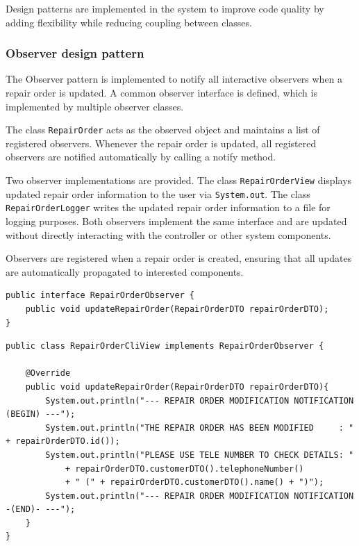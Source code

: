 \documentclass[a4paper]{scrartcl}
\begin{document}
Design patterns are implemented in the system to improve code quality by adding flexibility while reducing coupling between classes.

\subsubsection{Observer design pattern}

The Observer pattern is implemented to notify all interactive observers when a repair order is updated. A common observer interface is defined, which is implemented by multiple observer classes.

The class \texttt{RepairOrder} acts as the observed object and maintains a list of registered observers. Whenever the repair order is updated, all registered observers are notified automatically by calling a notify method.

Two observer implementations are provided. The class \texttt{RepairOrderView} displays updated repair order information to the user via \texttt{System.out}. The class \texttt{RepairOrderLogger} writes the updated repair order information to a file for logging purposes. Both observers implement the same interface and are updated without directly interacting with the controller or other system components.

Observers are registered when a repair order is created, ensuring that all updates are automatically propagated to interested components.

\begin{lstlisting}[style=javastyle, caption={RepairOrderObserver interface}]
public interface RepairOrderObserver {
    public void updateRepairOrder(RepairOrderDTO repairOrderDTO);
}
\end{lstlisting}

\begin{lstlisting}[style=javastyle, caption={RepairOrderCliView implementing RepairOrderObserver}]
public class RepairOrderCliView implements RepairOrderObserver {

    @Override
    public void updateRepairOrder(RepairOrderDTO repairOrderDTO){
        System.out.println("--- REPAIR ORDER MODIFICATION NOTIFICATION (BEGIN) ---");
        System.out.println("THE REPAIR ORDER HAS BEEN MODIFIED     : " + repairOrderDTO.id());
        System.out.println("PLEASE USE TELE NUMBER TO CHECK DETAILS: "
            + repairOrderDTO.customerDTO().telephoneNumber()
            + " (" + repairOrderDTO.customerDTO().name() + ")");
        System.out.println("--- REPAIR ORDER MODIFICATION NOTIFICATION -(END)- ---");
    }
}
\end{lstlisting}
\end{document}
